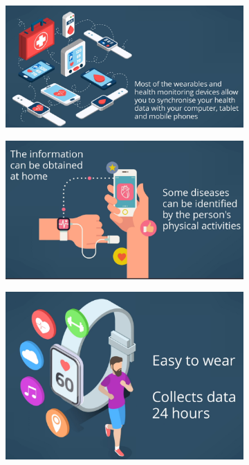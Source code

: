\documentclass[10pt, twoside]{article}   	%
\begin{document}
\begin{figure}
\begin{subfigure}[b]{0.35\textwidth}
\end{subfigure}
\hfill
     \begin{subfigure}[b]{0.99\textwidth}
         \centering
         \includegraphics[width=\textwidth]{wearable3.png}
     \end{subfigure}
     \hfill
\begin{subfigure}[b]{0.45\textwidth}
    \centering
    \includegraphics[width=\textwidth]{wearable1.png}
\end{subfigure}
\hfill
\begin{subfigure}[b]{0.37\textwidth}
    \centering
    \includegraphics[width=\textwidth]{wearable2.png}

\end{subfigure}
\end{figure}
\end{document}
